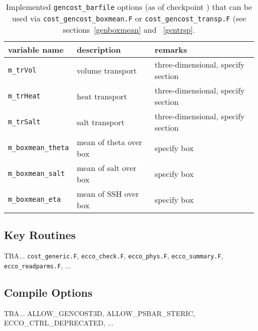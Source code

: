 \begin{table}[!ht]
\centering
\begin{tabular}{lll}
variable name				&	description						&	remarks \\ \hline\hline
\texttt{m\_trVol}			&	volume transport				& three-dimensional, specify section \\ 
\texttt{m\_trHeat}			&	heat transport					& three-dimensional, specify section \\ 
\texttt{m\_trSalt}			&	salt transport					& three-dimensional, specify section \\ 
\texttt{m\_boxmean\_theta}	&	mean of theta over box			& specify box \\
\texttt{m\_boxmean\_salt}	&	mean of salt over box			& specify box \\
\texttt{m\_boxmean\_eta}	&	mean of SSH over box			& specify box 
\end{tabular}
\caption{Implemented \texttt{gencost\_barfile} options (as of checkpoint \mitgcmCheckpointVersion) that can be used via \texttt{cost\_gencost\_boxmean.F} or \texttt{cost\_gencost\_transp.F} (see sections~\ref{genboxmean} and ~\ref{gentrsp}.}
\label{tbl:gencost_ecco_barfile_custom}
\end{table}



\subsection{Key Routines}

TBA... \texttt{cost\_generic.F}, \texttt{ecco\_check.F}, \texttt{ecco\_phys.F}, \texttt{ecco\_summary.F}, \texttt{ecco\_readparms.F}, ...

\subsection{Compile Options}

TBA... ALLOW\_GENCOST3D, ALLOW\_PSBAR\_STERIC, ECCO\_CTRL\_DEPRECATED, ...
